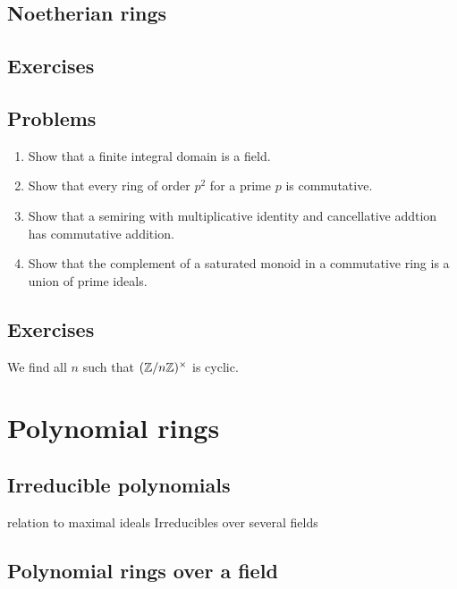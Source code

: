 \documentclass{../../large}
\begin{document}
\section{Noetherian rings}

\section*{Exercises}
\section*{Problems}
\begin{enumerate}
\item Show that a finite integral domain is a field.
\item Show that every ring of order $p^2$ for a prime $p$ is commutative.
\item Show that a semiring with multiplicative identity and cancellative addtion has commutative addition.
\item Show that the complement of a saturated monoid in a commutative ring is a union of prime ideals.
\end{enumerate}


\section*{Exercises}
\begin{prb}
We find all $n$ such that $(\mathbb{Z}/n\mathbb{Z})^\times$ is cyclic.
\end{prb}





\chapter{Polynomial rings}
\section{Irreducible polynomials}
relation to maximal ideals
Irreducibles over several fields
\begin{prb}
\end{prb}
\begin{prb}
\end{prb}

\section{Polynomial rings over a field}
\begin{prb}
\end{prb}
\begin{prb}
\end{prb}
\begin{prb}
\end{prb}
\end{document}
